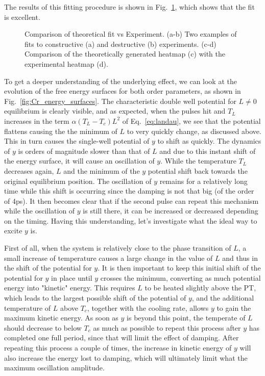 The results of this fitting procedure is shown in Fig.~\ref{fig:Cr_theoretical_fit}, which shows that the fit is excellent.  
\begin{figure}
\caption{\label{fig:Cr_theoretical_fit} Comparison of theoretical fit vs Experiment. (a-b) Two examples of fits to constructive (a) and destructive (b) experiments. (c-d) Comparison of the theoretically generated heatmap (c) with the experimental heatmap (d).}
\end{figure}
To get a deeper understanding of the underlying effect, we can look at the evolution of the free energy surfaces for both order parameters, as shown in Fig.~\ref{fig:Cr_energy_surfaces}. The characteristic double well potential for $L\neq0$ equilibrium is clearly visible, and as expected, when the pulses hit and $T_L$ increases in the term $\alpha(T_L-T_c)L^2$ of Eq.~\ref{eq:landau}, we see that the potential flattens causing the the minimum of $L$ to very quickly change, as discussed above. This in turn causes the single-well potential of $y$ to shift as quickly. The dynamics of $y$ is orders of magnitude slower than that of $L$ and due to this instant shift of the energy surface, it will cause an oscillation of $y$. While the temperature $T_L$ decreases again, $L$ and the minimum of the $y$ potential shift back towards the original equilibrium position. The oscillation of $y$ remains for a relatively long time while this shift is occurring since the damping is not that big (of the order of 4ps). It then becomes clear that if the second pulse can repeat this mechanism while the oscillation of $y$ is still there, it can be increased or decreased depending on the timing. Having this understanding, let's investigate what the ideal way to excite $y$ is. 

First of all, when the system is relatively close to the phase transition of $L$, a small increase of temperature causes a large change in the value of $L$ and thus in the shift of the potential for $y$. It is then important to keep this initial shift of the potential for $y$ in place until $y$ crosses the minimum, converting as much potential energy into "kinetic" energy. This requires $L$ to be heated slightly above the PT, which leads to the largest possible shift of the potential of $y$, and the additional temperature of $L$ above $T_c$, together with the cooling rate, allows $y$ to gain the maximum kinetic energy. As soon as $y$ is beyond this point, the temperate of $L$ should decrease to below $T_c$ as much as possible to repeat this process after $y$ has completed one full period, since that will limit the effect of damping. After repeating this process a couple of times, the increase in kinetic energy of $y$ will also increase the energy lost to damping, which will ultimately limit what the maximum oscillation amplitude. 

